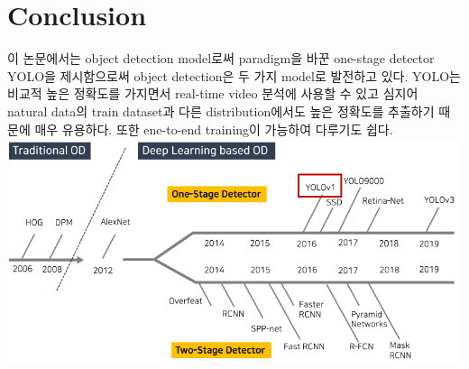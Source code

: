 \documentclass[extendedabs]{bmvc2k}
\begin{document}
\section{Conclusion}
\quad 이 논문에서는 object detection model로써 paradigm을 바꾼 one-stage detector YOLO을 제시함으로써 object detection은 
두 가지 model로 발전하고 있다.\cite{h} YOLO는 비교적 높은 정확도를 가지면서 real-time video 분석에 사용할 수 있고 
심지어 natural data의 train dataset과 다른 distribution에서도 높은 정확도를 추출하기 때문에 매우 유용하다. 
또한 ene-to-end training이 가능하여 다루기도 쉽다.
\newline  \includegraphics[width=\linewidth]{images/08_YOLO.PNG}

\newpage

\end{document}
